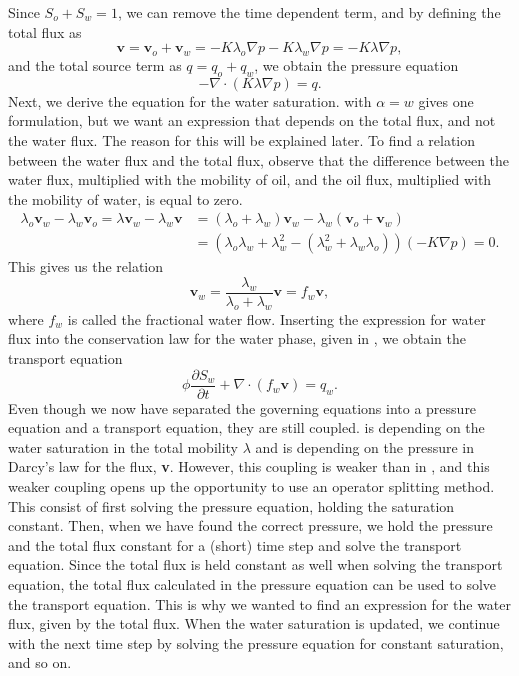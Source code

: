 Since $S_o + S_w = 1$, we can remove the time dependent term, and by defining the total flux as
\begin{equation*}
    \textbf{v} = \textbf{v}_o + \textbf{v}_w = -K\lambda_o\nabla p -K\lambda_w\nabla p = -K\lambda\nabla p,
\end{equation*}
and the total source term as $q = q_o + q_w$, we obtain the pressure equation
\begin{equation}
    -\nabla\cdot(K\lambda\nabla p) = q.
    \label{eq:pressureEq}
\end{equation}
Next, we derive the equation for the water saturation.  with $\alpha = w$ gives one formulation, but we want an expression that depends on the total flux, and not the water flux. The reason for this will be explained later. To find a relation between the water flux and the total flux, observe that the difference between the water flux, multiplied with the mobility of oil, and the oil flux, multiplied with the mobility of water, is equal to zero.
\begin{align*}
    \lambda_o\textbf{v}_w - \lambda_w \textbf{v}_o = \lambda\textbf{v}_w - \lambda_w\textbf{v} &= (\lambda_o + \lambda_w)\textbf{v}_w - \lambda_w(\textbf{v}_o + \textbf{v}_w) \\
    &= \left(\lambda_o\lambda_w + \lambda_w^2 - (\lambda_w^2 + \lambda_w\lambda_o)\right)\left(-K\nabla p\right) = 0.
\end{align*}
This gives us the relation 
\begin{equation*}
    \textbf{v}_w = \frac{\lambda_w}{\lambda_o + \lambda_w}\textbf{v} = f_w\textbf{v},
\end{equation*}
where $f_w$ is called the fractional water flow. Inserting the expression for water flux into the conservation law for the water phase, given in  , we obtain the transport equation
\begin{equation}
    \phi \frac{\partial S_w}{\partial t} + \nabla\cdot\left(f_w\textbf{v}\right) =  q_w.
    \label{eq:transportEq}
\end{equation}
Even though we now have separated the governing equations into a pressure equation and a transport equation, they are still coupled.  is depending on the water saturation in the total mobility $\lambda$ and  is depending on the pressure in Darcy's law for the flux, \textbf{v}. However, this coupling is weaker than in , and this weaker coupling opens up the opportunity to use an operator splitting method. This consist of first solving the pressure equation, holding the saturation constant. Then, when we have found the correct pressure, we hold the pressure and the total flux constant for a (short) time step and solve the transport equation. Since the total flux is held constant as well when solving the transport equation, the total flux calculated in the pressure equation can be used to solve the transport equation. This is why we wanted to find an expression for the water flux, given by the total flux. When the water saturation is updated, we continue with the next time step by solving the pressure equation for constant saturation, and so on.

